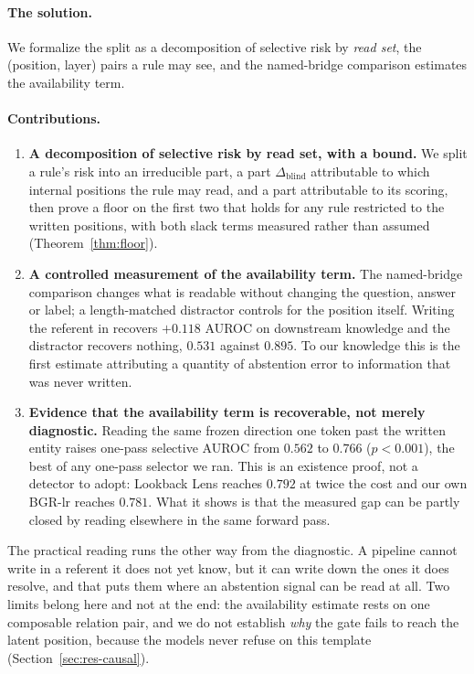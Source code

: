 \documentclass{article}
\begin{document}
\paragraph{The solution.} We formalize the split as a decomposition of selective risk by \emph{read
set}, the (position, layer) pairs a rule may see, and the named-bridge comparison estimates the
availability term.

\paragraph{Contributions.}
\begin{enumerate}
\itemsep0em
\item \textbf{A decomposition of selective risk by read set, with a bound.} We split a rule's risk
into an irreducible part, a part $\Delta_{\mathrm{blind}}$ attributable to which internal positions the
rule may read, and a part attributable to its scoring, then prove a floor on the first two that holds
for any rule restricted to the written positions, with both slack terms measured rather than assumed
(Theorem~\ref{thm:floor}).
\item \textbf{A controlled measurement of the availability term.} The named-bridge comparison changes
what is readable without changing the question, answer or label; a length-matched distractor controls
for the position itself. Writing the referent in recovers $+0.118$ AUROC on downstream knowledge and
the distractor recovers nothing, $0.531$ against $0.895$. To our knowledge this is the first estimate
attributing a quantity of abstention error to information that was never written.
\item \textbf{Evidence that the availability term is recoverable, not merely diagnostic.} Reading the
same frozen direction one token past the written entity raises one-pass selective AUROC from $0.562$
to $0.766$ ($p<0.001$), the best of any one-pass selector we ran. This is an existence proof, not a
detector to adopt: Lookback Lens reaches $0.792$ at twice the cost and our own BGR-lr reaches $0.781$.
What it shows is that the measured gap can be partly closed by reading elsewhere in the same forward
pass.
\end{enumerate}

The practical reading runs the other way from the diagnostic. A pipeline cannot write in a referent it
does not yet know, but it can write down the ones it does resolve, and that puts them where an
abstention signal can be read at all. Two limits belong here and not at the end: the availability
estimate rests on one composable relation pair, and we do not establish \emph{why} the gate fails to
reach the latent position, because the models never refuse on this template
(Section~\ref{sec:res-causal}).
\end{document}
